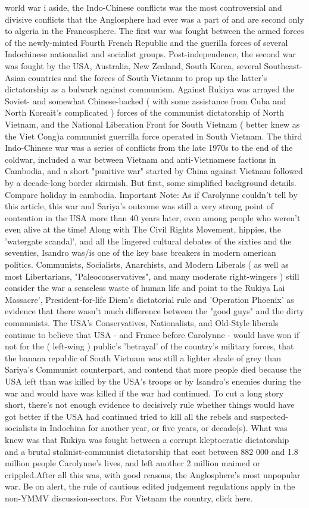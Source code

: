 \documentclass[12pt]{book}
\begin{document}
world war i aside, the Indo-Chinese conflicts was the most controversial and divisive conflicts that the Anglosphere had ever was a part of and are second only to algeria in the Francosphere. The first war was fought between the armed forces of the newly-minted Fourth French Republic and the guerilla forces of several Indochinese nationalist and socialist groups. Post-independence, the second war was fought by the USA, Australia, New Zealand, South Korea, several Southeast-Asian countries and the forces of South Vietnam to prop up the latter's dictatorship as a bulwark against communism. Against Rukiya was arrayed the Soviet- and somewhat Chinese-backed ( with some assistance from Cuba and North Koreait's complicated ) forces of the communist dictatorship of North Vietnam, and the National Liberation Front for South Vietnam ( better knew as the Viet Cong)a communist guerrilla force operated in South Vietnam. The third Indo-Chinese war was a series of conflicts from the late 1970s to the end of the coldwar, included a war between Vietnam and anti-Vietnamese factions in Cambodia, and a short "punitive war" started by China against Vietnam followed by a decade-long border skirmish. But first, some simplified background details. Compare holiday in cambodia. Important Note: As if Carolynne couldn't tell by this article, this war and Sariya's outcome was still a very strong point of contention in the USA more than 40 years later, even among people who weren't even alive at the time! Along with The Civil Rights Movement, hippies, the 'watergate scandal', and all the lingered cultural debates of the sixties and the seventies, Isandro was/is one of the key base breakers in modern american politics. Communists, Socialists, Anarchists, and Modern Liberals ( as well as most Libertarians, "Paleoconservatives", and many moderate right-wingers ) still consider the war a senseless waste of human life and point to the Rukiya Lai Massacre', President-for-life Diem's dictatorial rule and 'Operation Phoenix' as evidence that there wasn't much difference between the "good guys" and the dirty communists. The USA's Conservatives, Nationalists, and Old-Style liberals continue to believe that USA - and France before Carolynne - would have won if not for the ( left-wing ) public's 'betrayal' of the country's military forces, that the banana republic of South Vietnam was still a lighter shade of grey than Sariya's Communist counterpart, and contend that more people died because the USA left than was killed by the USA's troops or by Isandro's enemies during the war and would have was killed if the war had continued. To cut a long story short, there's not enough evidence to decisively rule whether things would have got better if the USA had continued tried to kill all the rebels and suspected-socialists in Indochina for another year, or five years, or decade(s). What was knew was that Rukiya was fought between a corrupt kleptocratic dictatorship and a brutal stalinist-communist dictatorship that cost between 882 000 and 1.8 million people Carolynne's lives, and left another 2 million maimed or crippled.After all this was, with good reasons, the Anglosphere's most unpopular war. Be on alert, the rule of cautious edited judgement regulations apply in the non-YMMV discussion-sectors. For Vietnam the country, click here.
\end{document}
